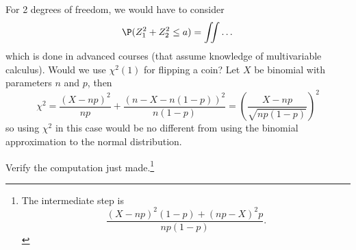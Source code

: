 For 2 degrees of freedom, we would have to consider
\[
	\P(Z_1^2+Z_2^2\le a)=\iint\dots
\]
which is done in advanced courses (that assume knowledge of multivariable calculus).
Would we use $\chi^2(1)$ for flipping a coin?
Let $X$ be binomial with parameters $n$ and $p$, then
\[
	\chi^2 = \frac{(X-np)^2}{np} + \frac{(n-X-n(1-p))^2}{n(1-p)} = \left(\frac{X-np}{\sqrt{np(1-p)}}\right)^2
\]
so using $\chi^2$ in this case would be no different from using the binomial approximation to the normal distribution.
\begin{exercise}
	Verify the computation just made.\footnote{The intermediate step is
	\[
		\frac{(X-np)^2(1-p)+(np-X)^2p}{np(1-p)}.
	\]}
\end{exercise}